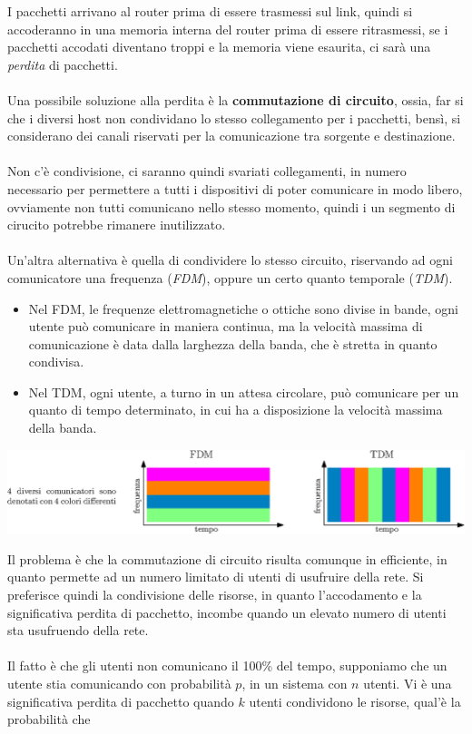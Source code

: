 \documentclass[12pt, letterpaper]{article}
\newcommand{\acc}{\\\hphantom{}\\}
\begin{document}
I pacchetti arrivano al router prima di essere trasmessi sul link, quindi si accoderanno in una memoria interna del router prima 
di essere ritrasmessi, se i pacchetti accodati diventano troppi e la memoria viene esaurita, ci sarà una \textit{perdita} di 
pacchetti. \acc 
Una possibile soluzione alla perdita è la \textbf{commutazione di circuito}, ossia, far si che i diversi host non condividano lo 
stesso collegamento per i pacchetti, bensì, si considerano dei canali riservati per la comunicazione tra sorgente e destinazione.\acc 
Non c'è condivisione, ci saranno quindi svariati collegamenti, in numero necessario per permettere a tutti i dispositivi di 
poter comunicare in modo libero, ovviamente non tutti comunicano nello stesso momento, quindi i un segmento di cirucito potrebbe 
rimanere inutilizzato.\acc 
Un'altra alternativa è quella di condividere lo stesso circuito, riservando ad ogni comunicatore una frequenza (\textit{FDM}), oppure un certo 
quanto temporale (\textit{TDM}).\begin{itemize}
    \item Nel FDM, le frequenze elettromagnetiche o ottiche sono divise in bande, ogni utente può comunicare in maniera continua, 
    ma la velocità massima di comunicazione è data dalla larghezza della banda, che è stretta in quanto condivisa.
    \item Nel TDM, ogni utente, a turno in un attesa circolare, può comunicare per un quanto di tempo determinato, in cui ha a 
    disposizione la velocità massima della banda.
\end{itemize}\begin{center}
    \includegraphics[width=1\textwidth ]{images/FdmTdm.eps}
\end{center}
Il problema è che la commutazione di circuito risulta comunque in efficiente, in quanto permette ad un numero 
limitato di utenti di usufruire della rete. Si preferisce quindi la condivisione delle risorse, in quanto l'accodamento e la 
significativa perdita di pacchetto, incombe quando un elevato numero di utenti sta usufruendo della rete.\acc 
Il fatto è che gli utenti non comunicano il 100\% del tempo, supponiamo che un utente stia comunicando con probabilità $p$, in un 
sistema con $n$ utenti. Vi è una significativa perdita di pacchetto quando $k$ utenti condividono le risorse, qual'è la probabilità che 
\end{document}
